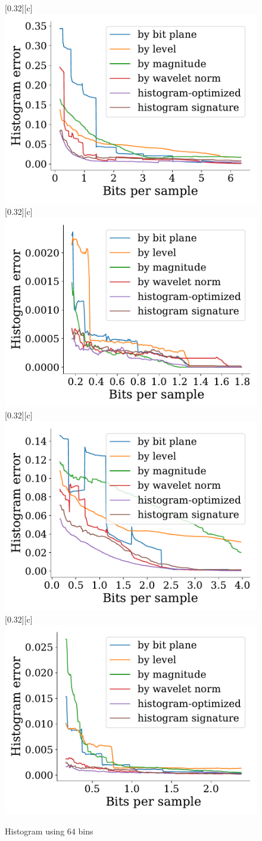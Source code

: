\documentclass{article}
\begin{document}
\begin{figure}[htb]
        [0.32\linewidth][c]{%
                \includegraphics[width=0.3\linewidth]{img/supplementary/histogram-optimized-vismale}}
        [0.32\linewidth][c]{%
                \includegraphics[width=0.3\linewidth]{img/supplementary/histogram-optimized-karfs}}
        [0.32\linewidth][c]{%
                \includegraphics[width=0.3\linewidth]{img/supplementary/histogram-optimized-aneurism}}
        [0.32\linewidth][c]{%
                \includegraphics[width=0.3\linewidth]{img/supplementary/histogram-optimized-velocityz}}
        \caption{Histogram using 64 bins}
\end{figure}
\end{document}

